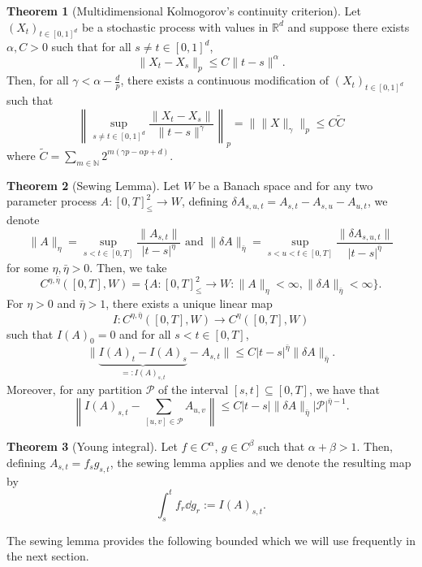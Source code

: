 \documentclass[]{article}
\theoremstyle{definition}
\newtheorem{theorem}{Theorem}
\theoremstyle{definition}
\begin{document}
\begin{theorem}[Multidimensional Kolmogorov's continuity criterion]
  Let \((X_t)_{t \in [0, 1]^d}\) be a stochastic process with values in \(\mathbb{R}^d\) and suppose 
  there exists \(\alpha, C > 0\) such that for all \(s \neq t \in [0, 1]^d\),
  \[\|X_t - X_s\|_p \le C \|t - s\|^\alpha.\]
  Then, for all \(\gamma < \alpha - \frac{d}{p}\), there exists a continuous modification of \((X_t)_{t \in [0, 1]^d}\)
  such that 
  \[\left\|\sup_{s \neq t \in [0, 1]^d} \frac{\|X_t - X_s\|}{\|t - s\|^\gamma}\right\|_p 
    = \|\|X\|_\gamma\|_p \le C \tilde C\]
  where \(\tilde C = \sum_{m \in \mathbb{N}} 2^{m(\gamma p - \alpha p + d)}\).
\end{theorem}

\begin{theorem}[Sewing Lemma]
  Let \(W\) be a Banach space and for any two parameter process \(A : [0, T]^2_\le \to W\), defining 
  \(\delta A_{s, u, t} = A_{s, t} - A_{s, u} - A_{u, t}\), we denote 
  \[\|A\|_\eta = \sup_{s < t \in [0, T]} \frac{\|A_{s, t}\|}{|t - s|^\eta} 
    \text{ and } 
    \|\delta A\|_{\bar \eta} = \sup_{s < u < t \in [0, T]} \frac{\|\delta A_{s, u, t}\|}{|t - s|^{\bar \eta}}\]
  for some \(\eta, \bar \eta> 0\). Then, we take 
  \[C^{\eta, \bar \eta}([0, T], W) = \{A : [0, T]^2_\le \to W : \|A\|_\eta < \infty, \|\delta A\|_{\bar \eta} < \infty\}.\]
  For \(\eta > 0\) and \(\bar \eta > 1\), there exists a unique linear map 
  \[I : C^{\eta, \bar \eta}([0, T], W) \to C^\eta([0, T], W)\]
  such that \(I(A)_0 = 0\) and for all \(s < t \in [0, T]\),
  \[\|\underbrace{I(A)_t - I(A)_s}_{=: I(A)_{s, t}} - A_{s, t}\| \le C |t - s|^{\bar \eta} \|\delta A\|_{\bar \eta}.\]
  Moreover, for any partition \(\mathcal{P}\) of the interval \([s, t] \subseteq [0, T]\), we have that 
  \[\left\|I(A)_{s, t} - \sum_{[u, v] \in \mathcal{P}} A_{u, v}\right\| 
    \le C|t - s| \|\delta A\|_{\bar \eta} |\mathcal{P}|^{\bar \eta - 1}.\]
\end{theorem}

\begin{theorem}[Young integral]
  Let \(f \in C^\alpha\), \(g \in C^\beta\) such that \(\alpha + \beta > 1\). Then, defining \(A_{s, t} = f_s g_{s, t}\), 
  the sewing lemma applies and we denote the resulting map by 
  \[\int_s^t f_r \dd g_r := I(A)_{s, t}.\]
\end{theorem}

The sewing lemma provides the following bounded which we will use frequently in the next section.
\end{document}
